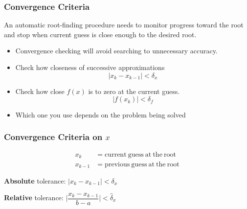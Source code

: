 \documentclass[10pt]{beamer}
\begin{document}
\begin{frame}
\frametitle{Convergence Criteria}

An automatic root-finding procedure needs to monitor progress toward the root
and stop when current guess is close enough to the desired root.

\begin{itemize}
    \item   Convergence checking will avoid searching to unnecessary accuracy.
    \item   Check how closeness of successive approximations
\begin{equation*}
                |x_k - x_{k-1}| < \delta_x
\end{equation*}
    \item   Check how close $f(x)$ is to zero at the current guess.
\begin{equation*}
                |f(x_k)| < \delta_f
\end{equation*}
    \item Which one you use depends on the problem being solved
\end{itemize}



\end{frame}
\begin{frame}[shrink]
\frametitle{Convergence Criteria on $x$}


\begin{center}
\end{center}

\begin{align*}
    x_k     &= \mathrm{current\ guess\ at\ the\ root}\\
    x_{k-1} &= \mathrm{previous\ guess\ at\ the\ root}
\end{align*}

\vspace{2ex}
\textbf{Absolute} tolerance: $\bigl| x_k - x_{k-1} \bigr| < \delta_x$

\textbf{Relative} tolerance: $\Biggl| \dfrac{x_k - x_{k-1}}{b-a} \Biggr| < \hat{\delta}_x$



\end{frame}
\end{document}
